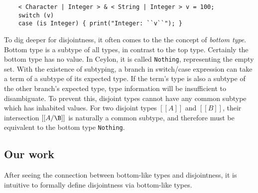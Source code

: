 \begin{lstlisting}
	< Character | Integer > & < String | Integer > v = 100;
	switch (v)
	case (is Integer) { print("Integer: ``v``"); }
\end{lstlisting}

To dig deeper for disjointness, it often comes to the the concept
of \emph{bottom type}.
Bottom type is a subtype of all types, in contrast to the top type.
Certainly the bottom type has no value.
In Ceylon, it is called \lstinline{Nothing}, representing the empty set.
%
With the existence of subtyping, a branch in switch/case expression
can take a term of a subtype of its expected type.
If the term's type is also a subtype of the other branch's expected
type, type information will be insufficient to disambiguate.
To prevent this, disjoint types cannot have any common subtype which has
inhabited values.
For two disjoint types $[[A]]$ and $[[B]]$, their intersection $[[A/\B]]$
is naturally a common subtype, and therefore must be equivalent to
the bottom type \lstinline{Nothing}.

\begin{comment}
Let us call them \emph{bottom-like types}.
In a switch construct, every case has a type annotation.
In Ceylon, this type annotation is not allowed to be bottom-like.
The compiler uses this type to narrow the static type of the input term
in switch/case, and rejects the program if the resultant type is equivalent
to \lstinline{Nothing}.
\end{comment}


\subsection{Our work}
After seeing the connection between bottom-like types and disjointness,
it is intuitive to formally define disjointness via bottom-like types.

